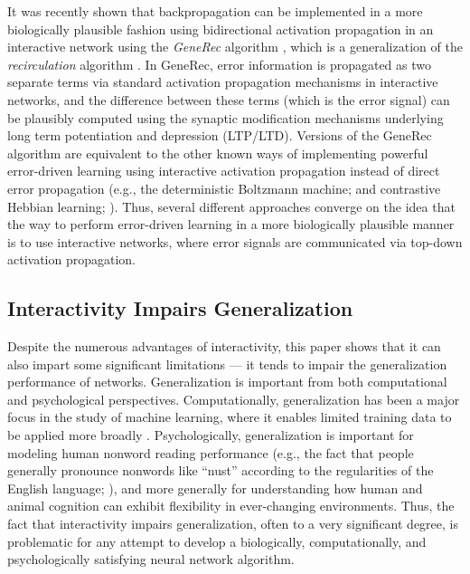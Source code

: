 \documentclass[12pt,twoside]{article}
\begin{document}
It was recently shown that backpropagation can be implemented in a
more biologically plausible fashion using bidirectional activation
propagation in an interactive network using the {\em GeneRec}
algorithm \cite{OReilly96}, which is a generalization of the {\em
  recirculation} algorithm \cite{HintonMcClelland88}.  In GeneRec,
error information is propagated as two separate terms via standard
activation propagation mechanisms in interactive networks, and the
difference between these terms (which is the error signal) can be
plausibly computed using the synaptic modification mechanisms
underlying long term potentiation and depression (LTP/LTD).  Versions
of the GeneRec algorithm are equivalent to the other known ways of
implementing powerful error-driven learning using interactive
activation propagation instead of direct error propagation (e.g., the
deterministic Boltzmann machine;  and contrastive
Hebbian learning; ).  Thus, several different
approaches converge on the idea that the way to perform error-driven
learning in a more biologically plausible manner is to use interactive
networks, where error signals are communicated via top-down activation
propagation.

\subsection{Interactivity Impairs Generalization}

Despite the numerous advantages of interactivity, this paper shows
that it can also impart some significant limitations --- it tends to
impair the generalization performance of networks.  Generalization is
important from both computational and psychological perspectives.
Computationally, generalization has been a major focus in the study of
machine learning, where it enables limited training data to be applied
more broadly
\cite[e.g.,]{WeigendRumelhartHuberman91,Wolpert92,VapnickChervonenkis71}.
Psychologically, generalization is important for modeling human
nonword reading performance (e.g., the fact that people generally
pronounce nonwords like ``nust'' according to the regularities of the
English language;
),
and more generally for understanding how human and animal cognition
can exhibit flexibility in ever-changing environments.  Thus, the fact
that interactivity impairs generalization, often to a very significant
degree, is problematic for any attempt to develop a biologically,
computationally, and psychologically satisfying neural network
algorithm.
\end{document}
